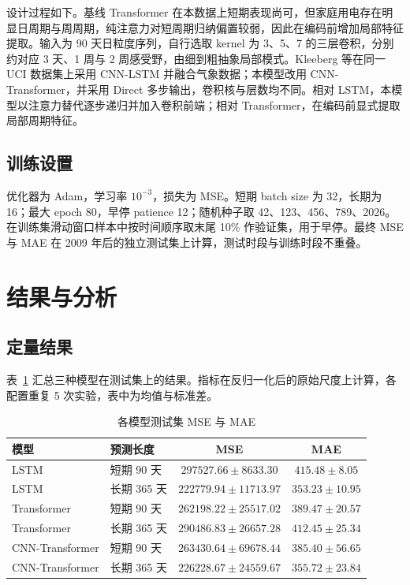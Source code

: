 \documentclass[UTF8,a4paper,12pt]{ctexart}
\begin{document}
设计过程如下。基线 Transformer 在本数据上短期表现尚可，但家庭用电存在明显日周期与周周期，纯注意力对短周期归纳偏置较弱\cite{zeng2023}，因此在编码前增加局部特征提取。输入为 90 天日粒度序列，自行选取 kernel 为 3、5、7 的三层卷积，分别约对应 3 天、1 周与 2 周感受野，由细到粗抽象局部模式。Kleeberg 等\cite{kleeberg2021}在同一 UCI 数据集上采用 CNN-LSTM 并融合气象数据；本模型改用 CNN-Transformer，并采用 Direct 多步输出，卷积核与层数均不同。相对 LSTM，本模型以注意力替代逐步递归并加入卷积前端；相对 Transformer，在编码前显式提取局部周期特征。

\subsection{训练设置}

优化器为 Adam，学习率 $10^{-3}$，损失为 MSE。短期 batch size 为 32，长期为 16；最大 epoch 80，早停 patience 12；随机种子取 42、123、456、789、2026。在训练集滑动窗口样本中按时间顺序取末尾 10\% 作验证集，用于早停。最终 MSE 与 MAE 在 2009 年后的独立测试集上计算，测试时段与训练时段不重叠。

\section{结果与分析}

\subsection{定量结果}

表~\ref{tab:results} 汇总三种模型在测试集上的结果。指标在反归一化后的原始尺度上计算，各配置重复 5 次实验，表中为均值与标准差。

\begin{table}[htbp]
    \centering
    \caption{各模型测试集 MSE 与 MAE}
    \label{tab:results}
    \begin{tabular}{llcc}
        \toprule
        模型 & 预测长度 & MSE & MAE \\
        \midrule
        LSTM            & 短期 90 天  & $297527.66 \pm 8633.30$  & $415.48 \pm 8.05$ \\
        LSTM            & 长期 365 天 & $\mathbf{222779.94 \pm 11713.97}$ & $\mathbf{353.23 \pm 10.95}$ \\
        Transformer     & 短期 90 天  & $262198.22 \pm 25517.02$ & $389.47 \pm 20.57$ \\
        Transformer     & 长期 365 天 & $290486.83 \pm 26657.28$ & $412.45 \pm 25.34$ \\
        CNN-Transformer & 短期 90 天  & $263430.64 \pm 69678.44$ & $385.40 \pm 56.65$ \\
        CNN-Transformer & 长期 365 天 & $226228.67 \pm 24559.67$ & $355.72 \pm 23.84$ \\
        \bottomrule
    \end{tabular}
\end{table}
\end{document}
